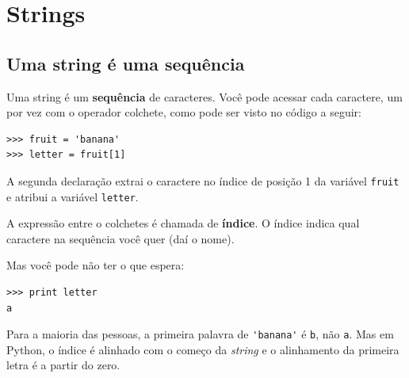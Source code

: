 
\chapter{Strings}
\label{strings}


\section{Uma string é uma sequência}

Uma string é um {\bf sequência} de caracteres. Você pode acessar cada
caractere, um por vez com o operador colchete, como pode ser visto no código
a seguir:

\beforeverb
\begin{verbatim}
>>> fruit = 'banana'
>>> letter = fruit[1]
\end{verbatim}
\afterverb
%
%
%
A segunda declaração extrai o caractere no índice de posição 1 da variável
{\tt fruit} e atribui a variável {\tt letter}.


A expressão entre o colchetes é chamada de {\bf índice}. O índice indica
qual caractere na sequência você quer (daí o nome).

Mas você pode não ter o que espera:

\beforeverb
\begin{verbatim}
>>> print letter
a
\end{verbatim}
\afterverb
%
%
Para a maioria das pessoas, a primeira palavra de \verb"'banana'" é {\tt b},
não {\tt a}. Mas em Python, o índice é alinhado com o começo da {\it string}
e o alinhamento da primeira letra é a partir do zero.

